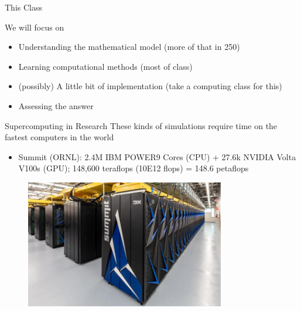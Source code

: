 \documentclass[xcolor=x11names]{beamer}
\begin{document}
\begin{frame}{This Class}

We will focus on
\begin{itemize}
\item Understanding the mathematical model (more of that in 250)
\item Learning computational methods (most of class)
\item (possibly) A little bit of implementation (take a computing class for this)
\item Assessing the answer
\end{itemize}
\end{frame}


\begin{frame}{Supercomputing in Research}
These kinds of simulations require time on the fastest computers in the world
\begin{itemize}
\item \textcolor{RawSienna}{Summit} (ORNL): 2.4M IBM POWER9 Cores (CPU) + 27.6k NVIDIA Volta V100s (GPU); \textcolor{dgreen}{148,600 teraflops (10E12 flops) = 148.6 petaflops}
\end{itemize}
\begin{figure}
\includegraphics[height=2.2in,clip]{2018-P01537.jpg}
\end{figure}
\end{frame}
\end{document}

